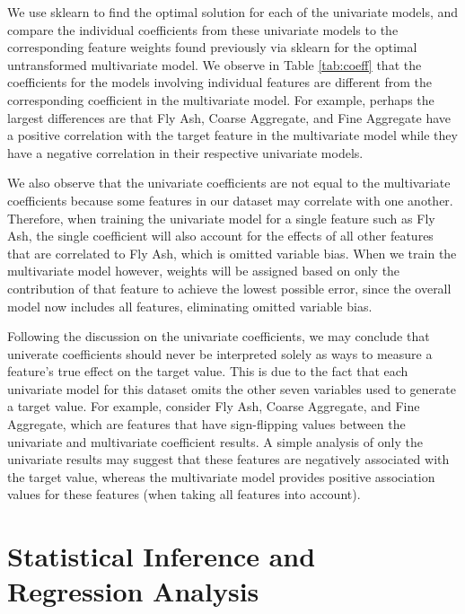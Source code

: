 \documentclass[12pt,letterpaper]{article}
\begin{document}
We use sklearn to find the optimal solution for each of the univariate models, and compare the individual coefficients from these univariate models to the corresponding feature weights found previously via sklearn for the optimal untransformed multivariate model. We observe in Table \ref{tab:coeff} that the coefficients for the models involving individual features are different from the corresponding coefficient in the multivariate model. For example, perhaps the largest differences are that Fly Ash, Coarse Aggregate, and Fine Aggregate have a positive correlation with the target feature in the multivariate model while they have a negative correlation in their respective univariate models.

We also observe that the univariate coefficients are not equal to the multivariate coefficients because some features in our dataset may correlate with one another. Therefore, when training the univariate model for a single feature such as Fly Ash, the single coefficient will also account for the effects of all other features that are correlated to Fly Ash, which is omitted variable bias. When we train the multivariate model however, weights will be assigned based on only the contribution of that feature to achieve the lowest possible error, since the overall model now includes all features, eliminating omitted variable bias.

Following the discussion on the univariate coefficients, we may conclude that univerate coefficients should never be interpreted solely as ways to measure a feature's true effect on the target value. This is due to the fact that each univariate model for this dataset omits the other seven variables used to generate a target value. For example, consider Fly Ash, Coarse Aggregate, and Fine Aggregate, which are features that have sign-flipping values between the univariate and multivariate coefficient results. A simple analysis of only the univariate results may suggest that these features are negatively associated with the target value, whereas the multivariate model provides positive association values for these features (when taking all features into account).

\newpage

\section{Statistical Inference and Regression Analysis}

\end{document}
